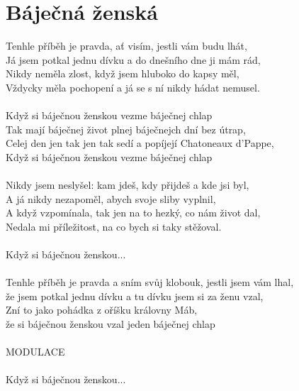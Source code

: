 \section{Báječná ženská}
Tenhle příběh je pravda, ať visím, jestli vám budu lhát,\\
Já jsem potkal jednu dívku a do dnešního dne ji mám rád,\\
Nikdy neměla zlost, když jsem hluboko do kapsy měl,\\
Vždycky měla pochopení a já se s ní nikdy hádat nemusel.\\
\\
Když si báječnou ženskou vezme báječnej chlap\\
Tak mají báječnej život plnej báječnejch dní bez útrap,\\
Celej den jen tak jen tak sedí a popíjejí Chatoneaux d'Pappe,\\
Když si báječnou ženskou vezme báječnej chlap\\
\\
Nikdy jsem neslyšel: kam jdeš, kdy přijdeš a kde jsi byl,\\
A já nikdy nezapoměl, abych svoje sliby vyplnil,\\
A když vzpomínala, tak jen na to hezký, co nám život dal,\\
Nedala mi příležitost, na co bych si taky stěžoval.\\
\\
Když si báječnou ženskou...\\
\\
Tenhle příběh je pravda a sním svůj klobouk, jestli jsem vám lhal,\\
že jsem potkal jednu dívku a tu dívku jsem si za ženu vzal,\\
Zní to jako pohádka z oříšku královny Máb,\\
že si báječnou ženskou vzal jeden báječnej chlap\\
\\
MODULACE\\
\\
Když si báječnou ženskou...\\
